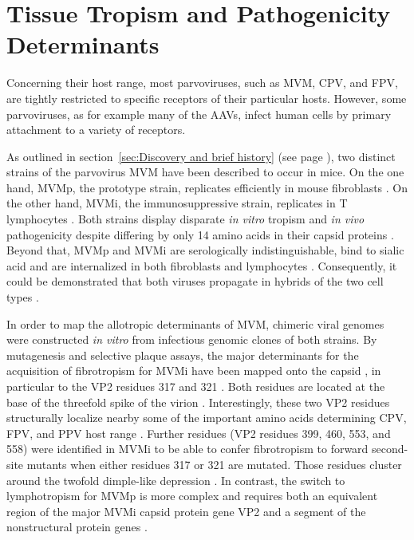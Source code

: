 


\section{Tissue Tropism and Pathogenicity Determinants}
Concerning their host range, most parvoviruses, such as MVM,  CPV,  and FPV,  are tightly restricted to specific receptors of their particular hosts. However, some parvoviruses, as for example many of the AAVs,  infect human cells by primary attachment to a variety of receptors. 

As outlined in section~\ref{sec:Discovery and brief history} (see page \pageref{sec:Discovery and brief history}), two distinct strains of the parvovirus MVM have been described to occur in mice. On the one hand, MVMp,  the prototype strain, replicates efficiently in mouse fibroblasts \cite{pmid5945715}. On the other hand, MVMi, the immunosuppressive strain, replicates in T lymphocytes \cite{pmid1244418}.
Both strains display disparate \textit{in vitro} tropism and \textit{in vivo} pathogenicity despite differing by only 14 amino acids in their capsid proteins \cite{pmid1871965}. Beyond that, MVMp and MVMi are serologically indistinguishable, bind to sialic acid and are internalized in both fibroblasts and lymphocytes \cite{pmid6602221}. Consequently, it could be demonstrated that both viruses propagate in hybrids of the two cell types \cite{pmid6602222}.    

In order to map the allotropic determinants of MVM, chimeric viral genomes were constructed \textit{in vitro} from infectious genomic clones of both strains. By mutagenesis and selective plaque assays, the major determinants for the acquisition of fibrotropism for MVMi have been mapped onto the capsid \cite{pmid3257270, pmid9519837, pmid1871965}, in particular to the VP2 residues 317 and 321 \cite{pmid7637028, pmid1316457}. Both residues are located at the base of the threefold spike of the virion \cite{pmid3357208, pmid3392768, pmid3257270}. Interestingly, these two VP2 residues structurally localize nearby some of the important amino acids determining CPV, FPV, and PPV host range \cite{pmid14581558, pmid12941920, pmid1532105}. Further residues (VP2 residues 399, 460, 553, and 558) were identified in MVMi to be able to confer fibrotropism to forward second-site mutants when either residues 317 or 321 are mutated. Those residues cluster around the twofold dimple-like depression \cite{pmid9817841}. In contrast, the switch to lymphotropism for MVMp is more complex and requires both an equivalent region of the major MVMi capsid protein gene VP2 and a segment of the nonstructural protein genes \cite{pmid9519837}.    

